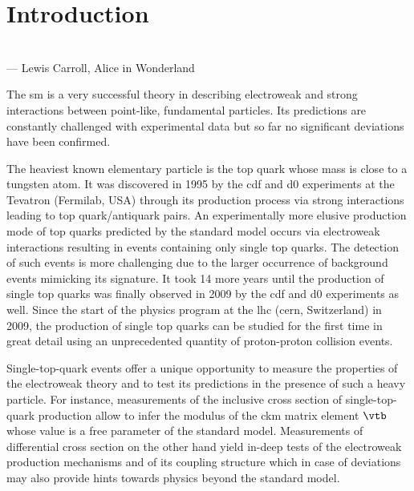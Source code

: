 \chapter*{Introduction}


\hspace{0.14\textwidth}\parbox[t][][t]{0.83\textwidth}{
\small{}\\\mbox{}\hfill --- Lewis Carroll, Alice in Wonderland\\[0.6\baselineskip]
}

The \acrlong{sm} is a very successful theory in describing electroweak and strong interactions between point-like, fundamental particles. Its predictions are constantly challenged with experimental data but so far no significant deviations have been confirmed. 

The heaviest known elementary particle is the top quark whose mass is close to a tungsten atom. It was discovered in 1995 by the \gls{cdf} and \gls{d0} experiments at the Tevatron (Fermilab, USA) through its production process via strong interactions leading to top quark/antiquark pairs. An experimentally more elusive production mode of top quarks predicted by the standard model occurs via electroweak interactions resulting in events containing only single top quarks. The detection of such events is more challenging due to the larger occurrence of background events mimicking its signature. It took 14 more years until the production of single top quarks was finally observed in 2009 by the \gls{cdf} and \gls{d0} experiments as well. Since the start of the physics program at the \gls{lhc} (\gls{cern}, Switzerland) in 2009, the production of single top quarks can be studied for the first time in great detail using an unprecedented quantity of proton-proton collision events.

Single-top-quark events offer a unique opportunity to measure the properties of the electroweak theory and to test its predictions in the presence of such a heavy particle. For instance, measurements of the inclusive cross section of single-top-quark production allow to infer the modulus of the \acrfull{ckm} matrix element $\vtb$ whose value is a free parameter of the standard model. Measurements of differential cross section on the other hand yield in-deep tests of the electroweak production mechanisms and of its coupling structure which in case of deviations may also provide hints towards physics beyond the standard model.

